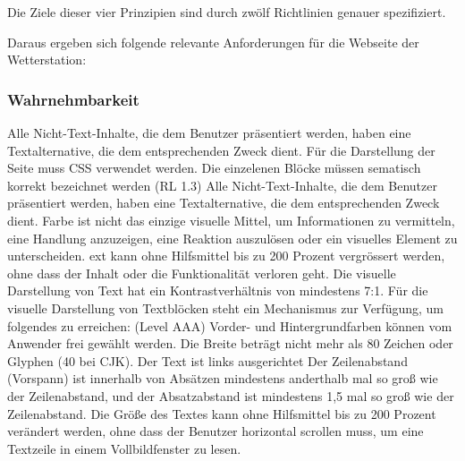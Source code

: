 Die Ziele dieser vier Prinzipien sind durch zwölf Richtlinien genauer spezifiziert. 






Daraus ergeben sich folgende relevante Anforderungen für die Webseite der Wetterstation:


\subsubsection*{Wahrnehmbarkeit}
Alle Nicht-Text-Inhalte, die dem Benutzer präsentiert werden, haben eine Textalternative, die dem entsprechenden Zweck dient.
Für die Darstellung der Seite muss CSS verwendet werden. Die einzelenen Blöcke müssen sematisch korrekt bezeichnet werden (RL 1.3)
Alle Nicht-Text-Inhalte, die dem Benutzer präsentiert werden, haben eine Textalternative, die dem entsprechenden Zweck dient.
Farbe ist nicht das einzige visuelle Mittel, um Informationen zu vermitteln, eine Handlung anzuzeigen, eine Reaktion auszulösen oder ein visuelles Element zu unterscheiden. ext kann ohne Hilfsmittel bis zu 200 Prozent vergrössert werden, ohne dass der Inhalt oder die Funktionalität verloren geht. Die visuelle Darstellung von Text hat ein Kontrastverhältnis von mindestens 7:1.
Für die visuelle Darstellung von Textblöcken steht ein Mechanismus zur Verfügung, um folgendes zu erreichen: (Level AAA)
Vorder- und Hintergrundfarben können vom Anwender frei gewählt werden.
Die Breite beträgt nicht mehr als 80 Zeichen oder Glyphen (40 bei CJK).
Der Text ist links ausgerichtet
Der Zeilenabstand (Vorspann) ist innerhalb von Absätzen mindestens anderthalb mal so groß wie der Zeilenabstand, und der Absatzabstand ist mindestens 1,5 mal so groß wie der Zeilenabstand.
Die Größe des Textes kann ohne Hilfsmittel bis zu 200 Prozent verändert werden, ohne dass der Benutzer horizontal scrollen muss, um eine Textzeile in einem Vollbildfenster zu lesen.

